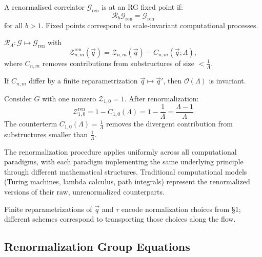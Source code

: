 \begin{definition}
\label{def:rg-fixed-points-renorm}
A renormalised correlator $\mathcal{G}_{\text{ren}}$ is at an RG fixed point if:
\[
\mathcal{R}_b \mathcal{G}_{\text{ren}} = \mathcal{G}_{\text{ren}}
\]
for all $b > 1$. Fixed points correspond to scale-invariant computational processes.
\end{definition}

\begin{definition}
\label{def:R-map}
$\mathcal{R}_\Lambda: \mathcal{G} \mapsto \mathcal{G}_{\text{ren}}$ with
\[
\mathcal{Z}_{n,m}^{\text{ren}}(\vec{q}) = \mathcal{Z}_{n,m}(\vec{q}) - C_{n,m}(\vec{q};\Lambda),
\]
where $C_{n,m}$ removes contributions from substructures of size $<\frac{1}{\Lambda}$.
\end{definition}

\begin{proposition}
\label{prop:scheme-independence}
If $C_{n,m}$ differ by a finite reparametrization $\vec{q} \mapsto \vec{q}'$, then $\mathcal{O}(\Lambda)$ is invariant.
\end{proposition}

\begin{example}
Consider $G$ with one nonzero $\mathcal{Z}_{1,0} = 1$. After renormalization:
\[
\mathcal{Z}_{1,0}^{\text{ren}} = 1 - C_{1,0}(\Lambda) = 1 - \frac{1}{\Lambda} = \frac{\Lambda-1}{\Lambda}
\]
The counterterm $C_{1,0}(\Lambda) = \frac{1}{\Lambda}$ removes the divergent contribution from substructures smaller than $\frac{1}{\Lambda}$.
\end{example}

The renormalization procedure applies uniformly across all computational paradigms, with each paradigm implementing the same underlying principle through different mathematical structures. Traditional computational models (Turing machines, lambda calculus, path integrals) represent the renormalized versions of their raw, unrenormalized counterparts.

Finite reparametrizations of $\vec{q}$ and $\tau$ encode normalization choices from §1; different schemes correspond to transporting those choices along the flow.

\subsection{Renormalization Group Equations}

